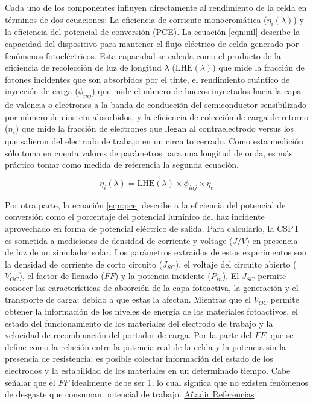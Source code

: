 Cada uno de los componentes influyen directamente al rendimiento de la celda en términos de dos ecuaciones: La eficiencia de corriente monocromática ($\eta_{i} (\lambda)$) y la eficiencia del potencial de conversión (PCE). La  ecuación \ref{eqn:nil} describe la capacidad del dispositivo para mantener el flujo eléctrico de celda generado por fenómenos fotoeléctricos. Esta capacidad se calcula como el producto de la eficiencia de recolección de luz de longitud $\lambda$ ($\text{LHE}(\lambda)$) que mide la fracción de fotones incidentes que son absorbidos por el tinte, el rendimiento cuántico de inyección de carga ($\phi_{inj}$) que mide el número de huecos inyectados hacia la capa de valencia o electrones a la banda de conducción del semiconductor sensibilizado por número de einstein absorbidos, y la eficiencia de colección de carga de retorno ($\eta_e$) que mide la fracción de electrones que llegan al contraelectrodo versus los que salieron del electrodo de trabajo en un circuito cerrado. Como esta medición sólo toma en cuenta valores de parámetros para una longitud de onda, es más práctico tomar como medida de referencia la segunda ecuación.


\begin{equation}
    \eta_{i}(\lambda) = \text{LHE}(\lambda)\times \phi_{inj} \times \eta_e
    \label{eqn:nil}
\end{equation}

Por otra parte, la  ecuación \ref{eqn:pce} describe a la eficiencia del potencial de conversión como el porcentaje del potencial lumínico del haz incidente aprovechado en forma de potencial eléctrico de salida. Para calcularlo, la CSPT es sometida a mediciones de densidad de corriente y voltage ($J/V$) en presencia de luz de un simulador solar. Los parámetros extraídos de estos experimentos son la densidad de corriente de corto circuito ($J_{SC}$), el voltaje del circuito abierto ($V_{OC}$), el factor de llenado ($FF$) y la potencia incidente ($P_{in}$). El $J_{SC}$ permite conocer las características de absorción de la capa fotoactiva, la generación y el transporte de carga; debido a que estas la afectan. Mientras que el $V_{OC}$ permite obtener la información de los niveles de energía de los materiales fotoactivos, el estado del funcionamiento de los materiales del electrodo de trabajo y la velocidad de recombinación del portador de carga. Por la parte del $FF$, que se define como la relación entre la potencia real de la celda y la potencia sin la presencia de resistencia; es posible colectar información del estado de los electrodos y la estabilidad de los materiales en un determinado tiempo. Cabe señalar que el $FF$ idealmente debe ser 1, lo cual signfica que no existen fenómenos de desgaste que consuman potencial de trabajo. \underline{Añadir Referencias}

